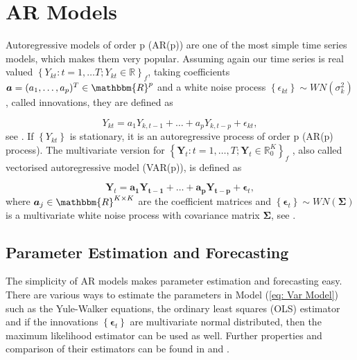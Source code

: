 \section{AR Models}
\label{sec: Ar Models}

Autoregressive models of order p (AR(p)) are one of the most simple time series models, which makes them very popular. Assuming again our time series is real valued $\left\{Y_{kt}:t=1,\ldots T; Y_{kt} \in \mathbb{R}\right\}_f$, taking coefficients $\bm{a}=(a_1,\ldots,a_p)^T \in \mathbbm{R}^p$ and a white noise process $\left\{\epsilon_{kt}\right\} \sim WN(\sigma_k^2)$, called innovations, they are defined as 

\begin{equation}
Y_{kt} = a_1Y_{k,t-1} + \ldots + a_p Y_{k,t-p} + \epsilon_{kt},
\label{eq: Ar model}
\end{equation}
%
see \textcite{Scherrer:2021}. If $\left\{ Y_{kt} \right\}$ is stationary, it is an autoregressive process of order p (AR(p) process). The multivariate version for  $\left\{\bm{Y}_t:t=1,\ldots,T; \bm{Y}_t \in \mathbb{R}_0^K \right\}_f$ , also called vectorised autoregressive model (VAR(p)), is defined as 

\begin{equation}
\bm{Y}_{t} = \bm{a_1 Y_{t-1}}+ \ldots + \bm{a_p Y_{t-p}} + \bm{\epsilon}_{t},
\label{eq: Var Model}
\end{equation}
%
where $\bm{a}_j \in \mathbbm{R}^{K \times K}$ are the coefficient matrices and $\left\{\bm{\epsilon}_t \right\}\sim WN(\bm{\Sigma})$ is a multivariate white noise process with covariance matrix $\bm{\Sigma}$, see \textcite{Scherrer:2021}. %

\subsection{Parameter Estimation and Forecasting}
\label{sec: AR Estimation and Forecasting}

The simplicity of AR models makes parameter estimation and forecasting easy. There are various ways to estimate the parameters in Model (\ref{eq: Var Model}) such as the Yule-Walker equations, the ordinary least squares (OLS) estimator and if the innovations $\left\{\bm{\epsilon}_t\right\}$ are multivariate normal distributed, then the maximum likelihood estimator can be used as well. Further properties and comparison of their estimators can be found in \textcite{Scherrer:2021} and \textcite{Hamilton:1994}. 

